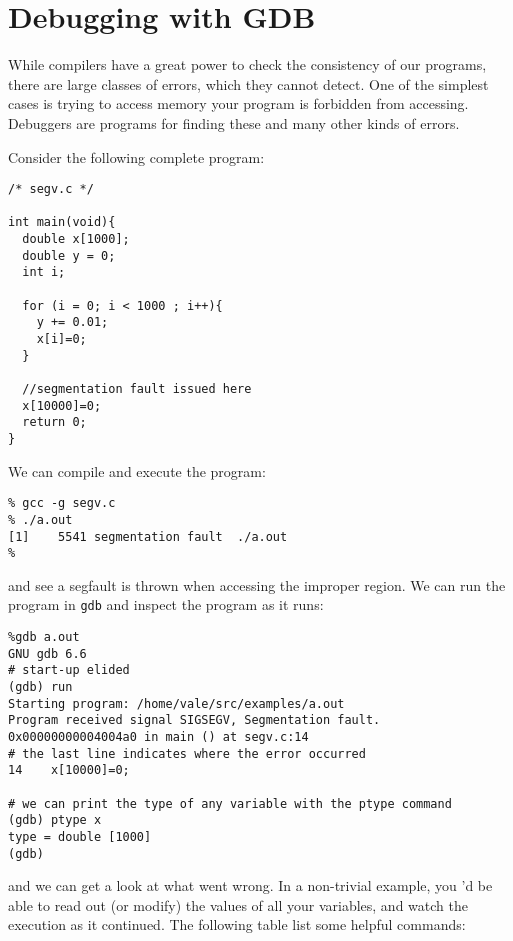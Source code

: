 \documentclass[letterpaper,12pt]{article}
\begin{document}
\section{Debugging with GDB}
While compilers have a great power to check the consistency of our programs, there are large classes of errors, which they cannot detect. One of the simplest cases is trying to access memory your program is forbidden from accessing. Debuggers are programs for finding these and many other kinds of errors.

Consider the following complete program:

\begin{verbatim}
/* segv.c */

int main(void){
  double x[1000];
  double y = 0;
  int i;
  
  for (i = 0; i < 1000 ; i++){
    y += 0.01;
    x[i]=0;
  }

  //segmentation fault issued here
  x[10000]=0;
  return 0;
}
\end{verbatim}

We can compile and execute the program:

\begin{verbatim}
% gcc -g segv.c              
% ./a.out 
[1]    5541 segmentation fault  ./a.out
%  
\end{verbatim}

and see a segfault is thrown when accessing the improper region. We can run the program in \texttt{gdb} and inspect the program as it runs:

\begin{verbatim}
%gdb a.out
GNU gdb 6.6
# start-up elided
(gdb) run
Starting program: /home/vale/src/examples/a.out 
Program received signal SIGSEGV, Segmentation fault.
0x00000000004004a0 in main () at segv.c:14
# the last line indicates where the error occurred
14	  x[10000]=0;

# we can print the type of any variable with the ptype command
(gdb) ptype x
type = double [1000]
(gdb) 
\end{verbatim}

and we can get a look at what went wrong. In a non-trivial example, you 'd be able to read out (or modify) the values of all your variables, and watch the execution as it continued. The following table list some helpful commands:
\end{document}
